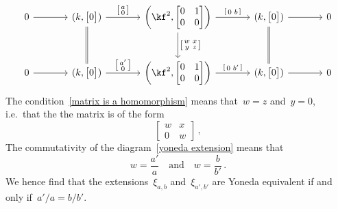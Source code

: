 \documentclass[a4paper, 11pt, twoside=semi]{scrartcl}
\begin{document}
\begin{equation}
  \label{yoneda extension}
  \begin{tikzcd}[ampersand replacement = \&, sep = large]
    0
    \arrow{r}
    \&
    (k, \begin{bmatrix} 0 \end{bmatrix})
    \arrow{r}[above]{ \begin{bsmallmatrix} a \\ 0 \end{bsmallmatrix} }
    \arrow[equal]{d}
    \&
    \biggl( \kf^2, \begin{bmatrix} 0 & 1 \\ 0 & 0 \end{bmatrix} \biggr)
    \arrow{r}[above]{ \begin{bsmallmatrix} 0 & b \end{bsmallmatrix} }
    \arrow{d}[right]{ \begin{bsmallmatrix} w & x \\ y & z \end{bsmallmatrix} }
    \&
    (k, \begin{bmatrix} 0 \end{bmatrix})
    \arrow{r}
    \arrow[equal]{d}
    \&
    0
    \\
    0
    \arrow{r}
    \&
    (k, \begin{bmatrix} 0 \end{bmatrix})
    \arrow{r}[above]{ \begin{bsmallmatrix} a' \\ 0 \end{bsmallmatrix} }
    \&
    \biggl( \kf^2, \begin{bmatrix} 0 & 1 \\ 0 & 0 \end{bmatrix} \biggr)
    \arrow{r}[above]{ \begin{bsmallmatrix} 0 & b' \end{bsmallmatrix} }
    \&
    (k, \begin{bmatrix} 0 \end{bmatrix})
    \arrow{r}
    \&
    0
  \end{tikzcd}
\end{equation}
The condition~\eqref{matrix is a homomorphism} means that~$w = z$ and~$y = 0$, i.e.\ that the the matrix is of the form
\[
  \begin{bmatrix}
    w & x \\
    0 & w
  \end{bmatrix} \,,
\]
The commutativity of the diagram~\eqref{yoneda extension} means that
\[
  w = \frac{a'}{a}
  \quad\text{and}\quad
  w = \frac{b}{b'} \,.
\]
We hence find that the extensions~$\xi_{a,b}$ and~$\xi_{a',b'}$ are Yoneda equivalent if and only if~$a'/a = b/b'$.
\end{document}
